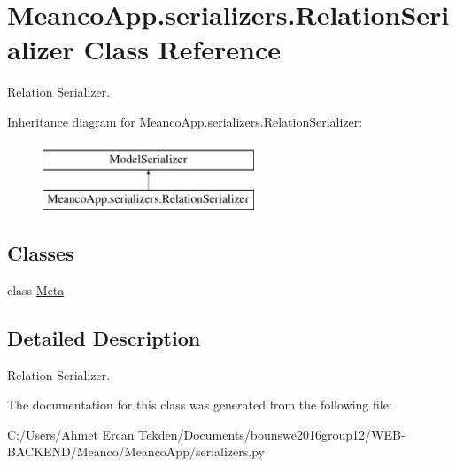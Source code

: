 \hypertarget{class_meanco_app_1_1serializers_1_1_relation_serializer}{}\section{Meanco\+App.\+serializers.\+Relation\+Serializer Class Reference}
\label{class_meanco_app_1_1serializers_1_1_relation_serializer}


Relation Serializer.  


Inheritance diagram for Meanco\+App.\+serializers.\+Relation\+Serializer\+:\begin{figure}[H]
\begin{center}
\leavevmode
\includegraphics[height=2.000000cm]{class_meanco_app_1_1serializers_1_1_relation_serializer}
\end{center}
\end{figure}
\subsection*{Classes}
\begin{DoxyCompactItemize}
\item 
class \hyperlink{class_meanco_app_1_1serializers_1_1_relation_serializer_1_1_meta}{Meta}
\end{DoxyCompactItemize}


\subsection{Detailed Description}
Relation Serializer. 

The documentation for this class was generated from the following file\+:\begin{DoxyCompactItemize}
\item 
C\+:/\+Users/\+Ahmet Ercan Tekden/\+Documents/bounswe2016group12/\+W\+E\+B-\/\+B\+A\+C\+K\+E\+N\+D/\+Meanco/\+Meanco\+App/serializers.\+py\end{DoxyCompactItemize}
